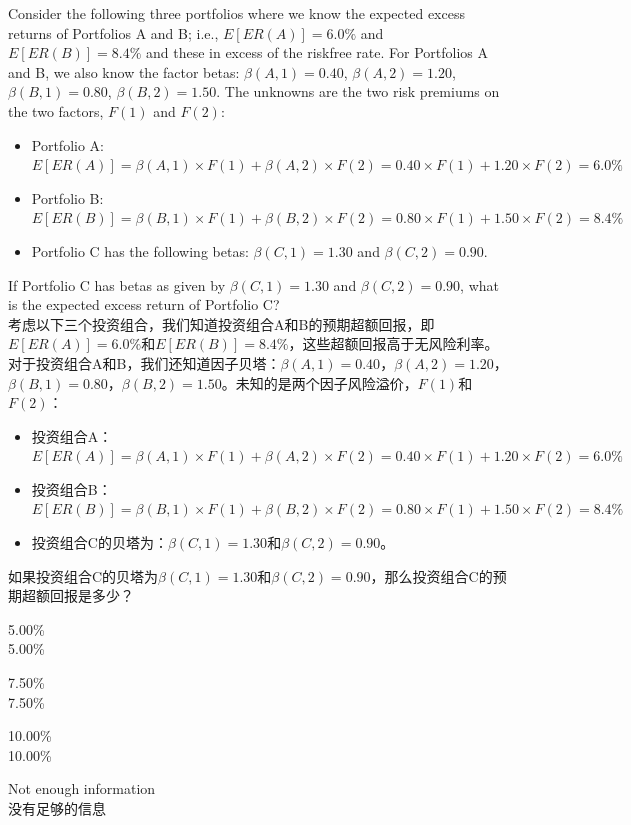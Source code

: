 \documentclass{article}
\newcounter{question} %
\begin{document}
\begin{question}
    Consider the following three portfolios where we know the expected excess returns of Portfolios A and B; i.e., $E[ER(A)] = 6.0\%$ and $E[ER(B)] = 8.4\%$ and these in excess of the riskfree rate. For Portfolios A and B, we also know the factor betas: $\beta(A,1) = 0.40$, $\beta(A,2) = 1.20$, $\beta(B,1) = 0.80$, $\beta(B,2) = 1.50$. The unknowns are the two risk premiums on the two factors, $F(1)$ and $F(2)$:
    \begin{itemize}
        \item Portfolio A: $E[ER(A)] = \beta(A,1) \times F(1) + \beta(A,2) \times F(2) = 0.40 \times F(1) + 1.20 \times F(2) = 6.0\%$
        \item Portfolio B: $E[ER(B)] = \beta(B,1) \times F(1) + \beta(B,2) \times F(2) = 0.80 \times F(1) + 1.50 \times F(2) = 8.4\%$
        \item Portfolio C has the following betas: $\beta(C,1) = 1.30$ and $\beta(C,2) = 0.90$.
    \end{itemize}
    
    If Portfolio C has betas as given by $\beta(C,1) = 1.30$ and $\beta(C,2) = 0.90$, what is the expected excess return of Portfolio C?
    \\考虑以下三个投资组合，我们知道投资组合A和B的预期超额回报，即$E[ER(A)] = 6.0\%$和$E[ER(B)] = 8.4\%$，这些超额回报高于无风险利率。对于投资组合A和B，我们还知道因子贝塔：$\beta(A,1) = 0.40$，$\beta(A,2) = 1.20$，$\beta(B,1) = 0.80$，$\beta(B,2) = 1.50$。未知的是两个因子风险溢价，$F(1)$和$F(2)$：
    \begin{itemize}
        \item 投资组合A：$E[ER(A)] = \beta(A,1) \times F(1) + \beta(A,2) \times F(2) = 0.40 \times F(1) + 1.20 \times F(2) = 6.0\%$
        \item 投资组合B：$E[ER(B)] = \beta(B,1) \times F(1) + \beta(B,2) \times F(2) = 0.80 \times F(1) + 1.50 \times F(2) = 8.4\%$
        \item 投资组合C的贝塔为：$\beta(C,1) = 1.30$和$\beta(C,2) = 0.90$。
    \end{itemize}
    如果投资组合C的贝塔为$\beta(C,1) = 1.30$和$\beta(C,2) = 0.90$，那么投资组合C的预期超额回报是多少？
\end{question}

\begin{choices}
    \item 5.00\%
    \\5.00\%
    \item 7.50\%
    \\7.50\%
    \item 10.00\%
    \\10.00\%
    \item Not enough information
    \\没有足够的信息
\end{choices}
\end{document}
